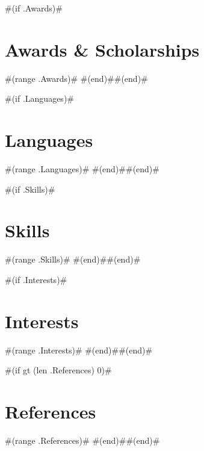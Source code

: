\documentclass[11pt,letterpaper,sans]{moderncv}        %
\begin{document}
#(if .Awards)#\section{Awards \& Scholarships}

#(range .Awards)#
#(end)##(end)#


#(if .Languages)#\section{Languages}
#(range .Languages)#
#(end)##(end)#

#(if .Skills)#\section{Skills}
#(range .Skills)#
#(end)##(end)#

#(if .Interests)#\section{Interests}
#(range .Interests)#
#(end)##(end)#

#(if gt (len .References) 0)#\section{References}
#(range .References)#
#(end)##(end)#

\newpage
\nocite{*}


\end{document}
